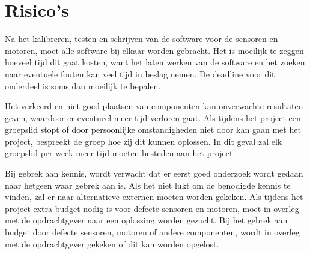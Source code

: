\section{Risico’s}
Na het kalibreren, testen en schrijven van de software voor de sensoren en motoren, moet alle software bij elkaar worden gebracht. Het is moeilijk te zeggen hoeveel tijd dit gaat kosten, want het laten werken van de software en het zoeken naar eventuele fouten kan veel tijd in beslag nemen. De deadline voor dit onderdeel is soms dan moeilijk te bepalen.

Het verkeerd en niet goed plaatsen van componenten kan onverwachte resultaten geven, waardoor er eventueel meer tijd verloren gaat.
Als tijdens het project een groepslid stopt of door persoonlijke omstandigheden niet door kan gaan met het project, bespreekt de groep hoe zij dit kunnen oplossen. In dit geval zal elk groepslid per week meer tijd moeten besteden aan het project.

Bij gebrek aan kennis, wordt verwacht dat er eerst goed onderzoek wordt gedaan naar hetgeen waar gebrek aan is. Als het niet lukt om de benodigde kennis te vinden, zal er naar alternatieve externen moeten worden gekeken.
Als tijdens het project extra budget nodig is voor defecte sensoren en motoren, moet in overleg met de opdrachtgever naar een oplossing worden gezocht. Bij het gebrek aan budget door defecte sensoren, motoren of andere componenten, wordt in overleg met de opdrachtgever gekeken of dit kan worden opgelost.
